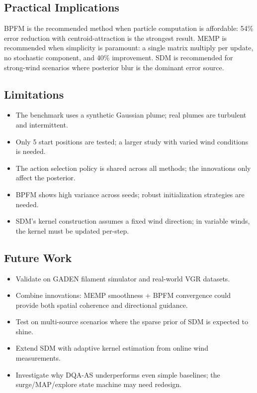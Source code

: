 \documentclass[conference]{IEEEtran}
\begin{document}
\subsection{Practical Implications}
BPFM is the recommended method when particle computation is affordable: 54\% error reduction with centroid-attraction is the strongest result.
MEMP is recommended when simplicity is paramount: a single matrix multiply per update, no stochastic component, and 40\% improvement.
SDM is recommended for strong-wind scenarios where posterior blur is the dominant error source.

\subsection{Limitations}
\begin{itemize}
    \item The benchmark uses a synthetic Gaussian plume; real plumes are turbulent and intermittent.
    \item Only 5 start positions are tested; a larger study with varied wind conditions is needed.
    \item The action selection policy is shared across all methods; the innovations only affect the posterior.
    \item BPFM shows high variance across seeds; robust initialization strategies are needed.
    \item SDM's kernel construction assumes a fixed wind direction; in variable winds, the kernel must be updated per-step.
\end{itemize}

\subsection{Future Work}
\begin{itemize}
    \item Validate on GADEN filament simulator and real-world VGR datasets.
    \item Combine innovations: MEMP smoothness + BPFM convergence could provide both spatial coherence and directional guidance.
    \item Test on multi-source scenarios where the sparse prior of SDM is expected to shine.
    \item Extend SDM with adaptive kernel estimation from online wind measurements.
    \item Investigate why DQA-AS underperforms even simple baselines; the surge/MAP/explore state machine may need redesign.
\end{itemize}
\end{document}

